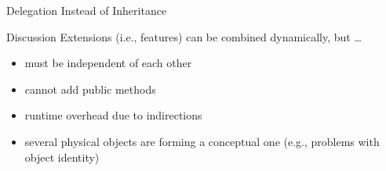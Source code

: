 \begin{frame}{Delegation Instead of Inheritance}
	\begin{fancycolumns}[widths={55}]
		\begin{note}{Discussion}
			Extensions (i.e., features) can be combined dynamically, but \ldots
			\begin{itemize}
				\item must be independent of each other
				\item cannot add public methods
				\item runtime overhead due to indirections
				\item several physical objects are forming a conceptual one (e.g., problems with object identity)
			\end{itemize}
		\end{note}
	\nextcolumn
	\end{fancycolumns}
\end{frame}
